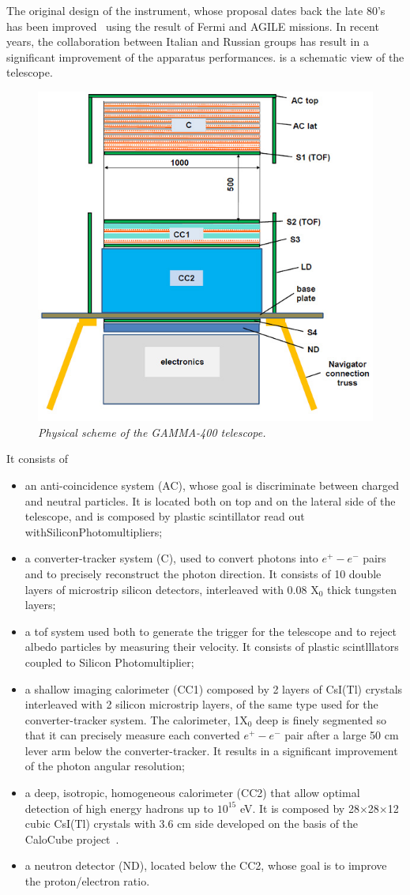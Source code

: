 The original design of the instrument, whose proposal dates back the late
80's~\cite{Dogiel1989} has been improved~\cite{Galper:2011bc} using the result
of Fermi and AGILE missions. In recent years, the collaboration between Italian
and Russian groups has result in a significant improvement of the apparatus
performances.  is a schematic view of the telescope.
\begin{figure}[!htbp]
\centering
\includegraphics[width=.4\textwidth]{immagini/gamma400_design.jpg}
\caption{\small \it Physical scheme of the GAMMA-400 telescope.}\label{fig:gamma400}
\end{figure}
It consists of
\begin{itemize}
\item an anti-coincidence system (AC), whose goal is discriminate between charged
  and neutral particles. It is located both on top and on the lateral side of
  the telescope, and is composed by plastic scintillator read out withSiliconPhotomultipliers;
\item a converter-tracker system (C), used to convert photons into $e^+-e^-$
  pairs and to precisely reconstruct the photon direction.  It consists of 10
  double layers of microstrip silicon detectors, interleaved with 0.08 X$_0$ thick tungsten
  layers;
\item a \gls{tof} system used both to generate the trigger for the telescope and
  to reject albedo particles by measuring their velocity. It consists of plastic
  scintlllators coupled to Silicon Photomultiplier;
\item a shallow imaging calorimeter (CC1) composed by 2 layers of CsI(Tl)
  crystals interleaved with 2 silicon microstrip layers, of the same type used
  for the converter-tracker system. The calorimeter, 1X$_0$ deep is finely
  segmented so that it can precisely measure each converted $e^+-e^-$ pair after
  a large 50 cm lever arm below the converter-tracker. It results in a
  significant improvement of the photon angular resolution;
\item a deep, isotropic, homogeneous calorimeter (CC2) that allow optimal
  detection of high energy hadrons up to $10^{15}$ eV. It is composed by 28$\times$28$\times$12
  cubic CsI(Tl) crystals with 3.6 cm side developed on the basis of the CaloCube
  project~\cite{Adriani:2013mya}. 
\item a neutron detector (ND), located below the CC2, whose goal is to improve the proton/electron ratio.
\end{itemize}

